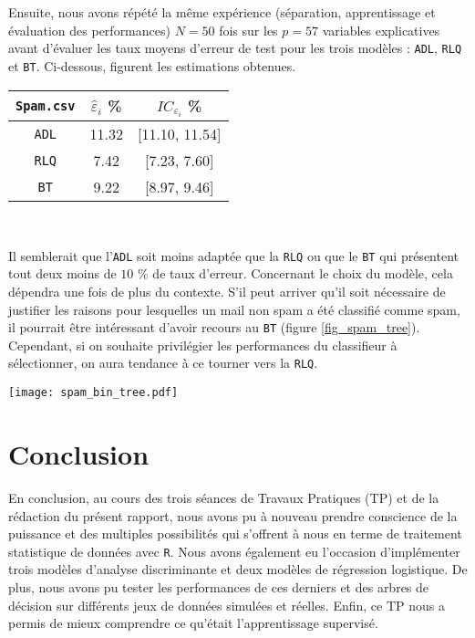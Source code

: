 \documentclass{article}
\begin{document}
\begin{multicols}{2}
Ensuite, nous avons répété la même expérience (séparation, apprentissage et évaluation des performances) $N = 50$ fois sur les $p = 57$ variables explicatives avant d'évaluer les taux moyens d'erreur de test pour les trois modèles : \texttt{ADL}, \texttt{RLQ} et \texttt{BT}. Ci-dessous, figurent les estimations obtenues.

\begin{center}
\begin{tabular}{| c || c | c |}
\hline
\texttt{Spam.csv} & $\widehat{\varepsilon}_i$ \% & $IC_{\varepsilon_{i}}$ \% \\
\hline
\hline
\texttt{ADL} & 11.32 & [11.10, 11.54] \\
\hline
\texttt{RLQ} &  7.42 & [7.23, 7.60] \\
\hline
\texttt{BT} & 9.22 & [8.97, 9.46] \\
\hline
\end{tabular}\\ 
\end{center}

Il semblerait que l'\texttt{ADL} soit moins adaptée que la \texttt{RLQ} ou que le \texttt{BT} qui présentent tout deux moins de $10$ \% de taux d'erreur. Concernant le choix du modèle, cela dépendra une fois de plus du contexte. S'il peut arriver qu'il soit nécessaire de justifier les raisons pour lesquelles un mail non spam a été classifié comme spam, il pourrait être intéressant d'avoir recours au \texttt{BT} (figure \ref{fig_spam_tree}). Cependant, si on souhaite privilégier les performances du classifieur à sélectionner, on aura tendance à ce tourner vers la \texttt{RLQ}.

\begingroup
   \centering
   \texttt{[image: spam\_bin\_tree.pdf]}
    \label{fig_spam_tree}
\endgroup

\section{Conclusion}
En conclusion, au cours des trois séances de Travaux Pratiques (TP) et de la rédaction du présent rapport, nous avons pu à nouveau prendre conscience de la puissance et des multiples possibilités qui s’offrent à nous en terme de traitement statistique de données avec \texttt{R}. Nous avons également eu l'occasion d'implémenter trois modèles d'analyse discriminante et deux modèles de régression logistique. De plus, nous avons pu tester les performances de ces derniers et des arbres de décision sur différents jeux de données simulées et réelles. Enfin, ce TP nous a permis de mieux comprendre ce qu'était l'apprentissage supervisé.


\end{multicols}
\end{document}
